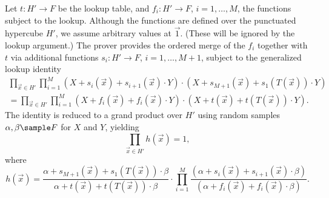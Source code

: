 \documentclass[11pt]{article}
\theoremstyle{definition}
\theoremstyle{remark}
\begin{document}
Let $t: H'\rightarrow F$ be the lookup table, and $f_i:  H'\rightarrow F$, $i=1,\ldots,M$, the functions subject to the lookup.
Although the functions are defined over the punctuated hypercube $H'$, we assume arbitrary values at $\vec 1$.
(These will be ignored by the lookup argument.)
The prover provides the ordered merge of the $f_i$  together with $t$ via additional functions $s_i: H'\rightarrow F$, $i=1,\ldots, M+1$, subject to the generalized lookup identity
\begin{multline*}
\prod_{\vec x\in H'} \prod_{i=1}^{M} (X + s_{i}(\vec x) + s_{i+1}(\vec x)\cdot Y)\cdot (X + s_{M+1}(\vec x) + s_1(T(\vec x))\cdot Y)
\\
= \prod_{\vec x\in H'} \prod_{i=1}^{M} (X + f_i(\vec x) + f_i(\vec x)\cdot Y)\cdot (X + t(\vec x) + t(T(\vec x))\cdot Y).
\end{multline*}
The identity is reduced to a grand product over $H'$ using random samples $\alpha, \beta\sample F$ for $X$ and $Y$, yielding 
\[
\prod_{\vec x\in H'} h(\vec x) = 1,
\]
where 
\[
h(\vec x) = \frac{\alpha + s_{M+1}(\vec x) + s_1(T(\vec x))\cdot \beta}{\alpha + t(\vec x) + t(T(\vec x))\cdot \beta}\cdot 
\prod_{i=1}^M \frac{(\alpha + s_i(\vec x) + s_{i+1}(\vec x)\cdot \beta)}{
(\alpha + f_i(\vec x) + f_i(\vec x)\cdot \beta)}.
\]
\end{document}
